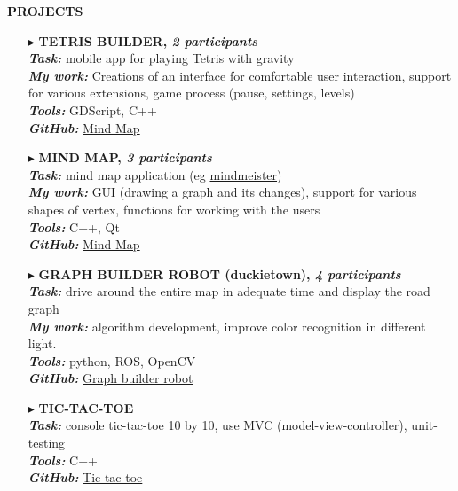 \documentclass[a4paper,10pt]{article}
\begin{document}
	\colorbox{magicmint}{
		\begin{minipage}{0.96\textwidth}
			\vphantom{.}
			\textbf{PROJECTS}
		\end{minipage}
	}
	\begin{itemize}
	
		\item[$\blacktriangleright$] \textbf{TETRIS BUILDER, \textit{2 participants}}\\
		\textit{\textbf{Task:}} mobile app for playing Tetris with gravity\\
		\textit{\textbf{My work:}} Creations of an interface for comfortable user interaction, support for various extensions, game process (pause, settings, levels) \\
		\textit{\textbf{Tools:}} GDScript, C++\\
		\textit{\textbf{GitHub:}} \href{https://github.com/a-alex-l/TetrisBuilder} {Mind Map}		
		
		\item[$\blacktriangleright$] \textbf{MIND MAP, \textit{3 participants}}\\
		\textit{\textbf{Task:}} mind map application (eg \href{https://www.mindmeister.com} {mindmeister})\\
		\textit{\textbf{My work:}} GUI (drawing a graph and its changes), support for various shapes of vertex, functions for working with the users \\
		\textit{\textbf{Tools:}} C++, Qt\\
		\textit{\textbf{GitHub:}} \href{https://github.com/Kira5005-code/Mind-Map} {Mind Map}
		
		\item[$\blacktriangleright$] \textbf{GRAPH BUILDER ROBOT (duckietown), \textit{4 participants}}\\
	\textit{\textbf{Task:}} drive around the entire map in adequate time and display the road graph\\
		\textit{\textbf{My work:}} algorithm development, improve color recognition in different light. \\
		\textit{\textbf{Tools:}} python, ROS, OpenCV\\
		\textit{\textbf{GitHub:}} \href{https://github.com/Kira5005-code/template-ros-core} {Graph builder robot}
		
		\item[$\blacktriangleright$] \textbf{TIC-TAC-TOE}\\
		\textit{\textbf{Task:}} console tic-tac-toe 10 by 10, use MVC (model-view-controller), unit-testing\\
		\textit{\textbf{Tools:}} C++\\
		\textit{\textbf{GitHub:}} \href{https://github.com/Kira5005-code/Tic-tac-toe} {Tic-tac-toe}
	\end{itemize}
\end{document}
